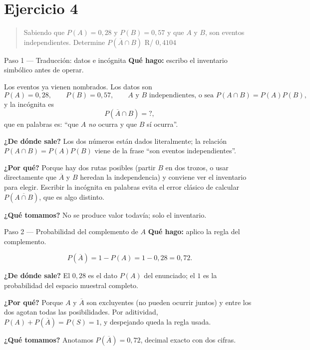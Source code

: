 \documentclass[11pt]{article}
\begin{document}
\section*{Ejercicio 4}

\begin{quote}
Sabiendo que $P(A) = 0{,}28$ y $P(B) = 0{,}57$ y que $A$ y $B$, son eventos independientes. Determine $P(\overline{A} \cap B)$ \hfill R/ $0{,}4104$
\end{quote}

\begin{paso}{Paso 1 --- Traducción: datos e incógnita}
\textbf{Qué hago:} escribo el inventario simbólico antes de operar.

Los eventos ya vienen nombrados. Los datos son
\[
P(A)=0{,}28,\qquad P(B)=0{,}57,\qquad A \text{ y } B \text{ independientes, o sea } P(A\cap B)=P(A)P(B),
\]
y la incógnita es
\[
P(\overline{A}\cap B)=?,
\]
que en palabras es: ``que $A$ \emph{no} ocurra y que $B$ sí ocurra''.

\textbf{¿De dónde sale?} Los dos números están dados literalmente; la relación $P(A\cap B)=P(A)P(B)$ viene de la frase ``son eventos independientes''.

\textbf{¿Por qué?} Porque hay dos rutas posibles (partir $B$ en dos trozos, o usar directamente que $\overline{A}$ y $B$ heredan la independencia) y conviene ver el inventario para elegir. Escribir la incógnita en palabras evita el error clásico de calcular $P(\overline{A\cap B})$, que es algo distinto.

\textbf{¿Qué tomamos?} No se produce valor todavía; solo el inventario.
\end{paso}

\begin{paso}{Paso 2 --- Probabilidad del complemento de $A$}
\textbf{Qué hago:} aplico la regla del complemento.

\[
P(\overline{A})=1-P(A)=1-0{,}28=0{,}72.
\]

\textbf{¿De dónde sale?} El $0{,}28$ es el dato $P(A)$ del enunciado; el $1$ es la probabilidad del espacio muestral completo.

\textbf{¿Por qué?} Porque $A$ y $\overline{A}$ son excluyentes (no pueden ocurrir juntos) y entre los dos agotan todas las posibilidades. Por aditividad, $P(A)+P(\overline{A})=P(S)=1$, y despejando queda la regla usada.

\textbf{¿Qué tomamos?} Anotamos $P(\overline{A})=0{,}72$, decimal exacto con dos cifras.
\end{paso}
\end{document}
